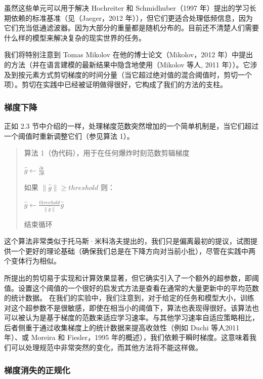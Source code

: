 虽然这些单元可以用于解决 Hochreiter 和 Schmidhuber（1997 年）提出的学习长期依赖的标准基准（见（Jaeger，2012 年）），但它们更适合处理低频信息，因为它们充当低通滤波器。因为大部分的重量都是随机分布的。目前还不清楚人们需要什么样的模型来解决复杂的现实世界的任务。

我们将特别注意到 Tomas Mikolov 在他的博士论文（Mikolov，2012 年）中提出的方法（并在语言建模的最新结果中隐含地使用（Mikolov 等人, 2011 年））。它涉及到按元素方式剪切梯度的时间分量（当它超过绝对值的混合阈值时，剪切一个项）。剪切在实践中已经被证明做得很好，它构成了我们的方法的支柱。

\subsubsection{梯度下降}\label{32-ux68afux5ea6ux4e0bux964d}

正如 2.3 节中介绍的一样，处理梯度范数突然增加的一个简单机制是，当它们超过一个阈值时重新调整它们（参见算法 1）。

\begin{quote}
  算法 1（伪代码），用于在任何爆炸时刻范数剪辑梯度

  \(\hat{g}\leftarrow\frac{\partial\epsilon}{\partial\theta}\)

  如果 \(\|\hat{g}\|\geq threshold\) 则：

  \(\hat{g}\leftarrow\frac{threehold}{\|\hat{g}\|}\hat{g}\)

  结束循环
\end{quote}

这个算法非常类似于托马斯·米科洛夫提出的，我们只是偏离最初的提议，试图提供一个更好的理论基础（确保我们总是在下降方向对当前小批），尽管在实践中两个变体行为相似。

所提出的剪切易于实现和计算效果显著，但它确实引入了一个额外的超参数，即阈值。设置这个阈值的一个很好的启发式方法是查看在通常的大量更新中的平均范数的统计数据。 在我们的实验中，我们注意到，对于给定的任务和模型大小，训练对这个超参数不是很敏感，即使在相当小的阈值下，算法也表现得很好。该算法也可以被认为是基于梯度的范数来适应学习速率。与其他学习速率自适应策略相比，后者侧重于通过收集梯度上的统计数据来提高收敛性（例如 Duchi 等人2011 年）、或 Moreira 和 Fiesler，1995 年的概述），我们依赖于瞬时梯度。这意味着我们可以处理规范中非常突然的变化，而其他方法将不能这样做。

\subsubsection{梯度消失的正规化}\label{33-ux68afux5ea6ux6d88ux5931ux7684ux6b63ux89c4ux5316}

